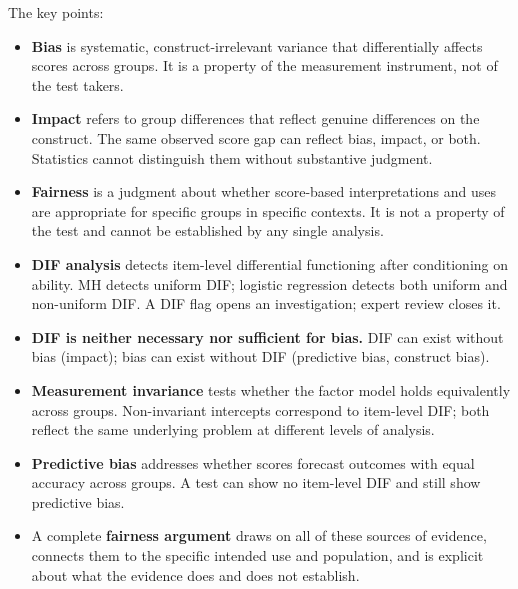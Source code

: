 \documentclass[
  11pt,
  letterpaper,
]{scrbook}
\providecommand{\tightlist}{%
  \setlength{\itemsep}{0pt}\setlength{\parskip}{0pt}}
\begin{document}
The key points:

\begin{itemize}
\tightlist
\item
  \textbf{Bias} is systematic, construct-irrelevant variance that
  differentially affects scores across groups. It is a property of the
  measurement instrument, not of the test takers.
\item
  \textbf{Impact} refers to group differences that reflect genuine
  differences on the construct. The same observed score gap can reflect
  bias, impact, or both. Statistics cannot distinguish them without
  substantive judgment.
\item
  \textbf{Fairness} is a judgment about whether score-based
  interpretations and uses are appropriate for specific groups in
  specific contexts. It is not a property of the test and cannot be
  established by any single analysis.
\item
  \textbf{DIF analysis} detects item-level differential functioning
  after conditioning on ability. MH detects uniform DIF; logistic
  regression detects both uniform and non-uniform DIF. A DIF flag opens
  an investigation; expert review closes it.
\item
  \textbf{DIF is neither necessary nor sufficient for bias.} DIF can
  exist without bias (impact); bias can exist without DIF (predictive
  bias, construct bias).
\item
  \textbf{Measurement invariance} tests whether the factor model holds
  equivalently across groups. Non-invariant intercepts correspond to
  item-level DIF; both reflect the same underlying problem at different
  levels of analysis.
\item
  \textbf{Predictive bias} addresses whether scores forecast outcomes
  with equal accuracy across groups. A test can show no item-level DIF
  and still show predictive bias.
\item
  A complete \textbf{fairness argument} draws on all of these sources of
  evidence, connects them to the specific intended use and population,
  and is explicit about what the evidence does and does not establish.
\end{itemize}

\chapter{}\label{section-8}

\chapter{}\label{section-9}
\end{document}
